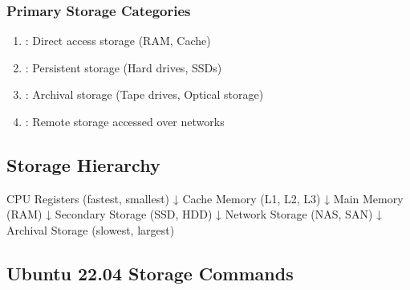 \documentclass[letterpaper,10pt,english]{sphinxmanual}
\begin{document}
\subsubsection{Primary Storage Categories}
\label{\detokenize{storage-overview:primary-storage-categories}}\begin{enumerate}
%
\item {} 
\sphinxAtStartPar
{}: Direct access storage (RAM, Cache)

\item {} 
\sphinxAtStartPar
{}: Persistent storage (Hard drives, SSDs)

\item {} 
\sphinxAtStartPar
{}: Archival storage (Tape drives, Optical storage)

\item {} 
\sphinxAtStartPar
{}: Remote storage accessed over networks

\end{enumerate}


\subsection{Storage Hierarchy}
\label{\detokenize{storage-overview:storage-hierarchy}}
\begin{sphinxVerbatim}[commandchars=\\\{\}]
CPU Registers (fastest, smallest)
↓
Cache Memory (L1, L2, L3)
↓
Main Memory (RAM)
↓
Secondary Storage (SSD, HDD)
↓
Network Storage (NAS, SAN)
↓
Archival Storage (slowest, largest)
\end{sphinxVerbatim}


\subsection{Ubuntu 22.04 Storage Commands}
\label{\detokenize{storage-overview:ubuntu-22-04-storage-commands}}
\end{document}
